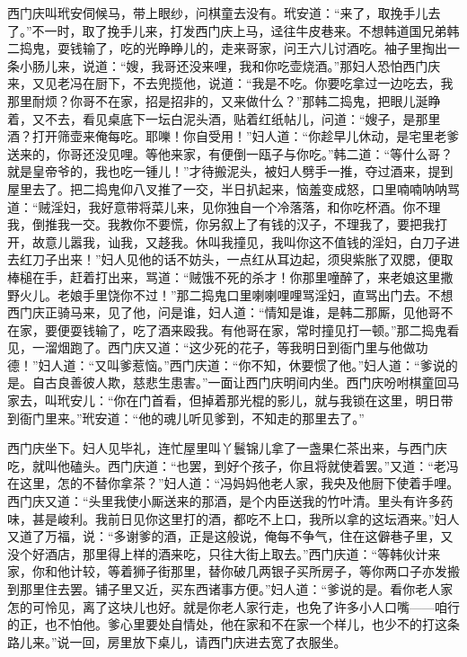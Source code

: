 西门庆叫玳安伺候马，带上眼纱，问棋童去没有。玳安道：“来了，取挽手儿去了。”不一时，取了挽手儿来，打发西门庆上马，迳往牛皮巷来。不想韩道国兄弟韩二捣鬼，耍钱输了，吃的光睁睁儿的，走来哥家，问王六儿讨酒吃。袖子里掏出一条小肠儿来，说道：“嫂，我哥还没来哩，我和你吃壶烧酒。”那妇人恐怕西门庆来，又见老冯在厨下，不去兜揽他，说道：“我是不吃。你要吃拿过一边吃去，我那里耐烦？你哥不在家，招是招非的，又来做什么？”那韩二捣鬼，把眼儿涎睁着，又不去，看见桌底下一坛白泥头酒，贴着红纸帖儿，问道：“嫂子，是那里酒？打开筛壶来俺每吃。耶嚛！你自受用！”妇人道：“你趁早儿休动，是宅里老爹送来的，你哥还没见哩。等他来家，有便倒一瓯子与你吃。”韩二道：“等什么哥？就是皇帝爷的，我也吃一锺儿！”才待搬泥头，被妇人劈手一推，夺过酒来，提到屋里去了。把二捣鬼仰八叉推了一交，半日扒起来，恼羞变成怒，口里喃喃呐呐骂道：“贼淫妇，我好意带将菜儿来，见你独自一个冷落落，和你吃杯酒。你不理我，倒推我一交。我教你不要慌，你另叙上了有钱的汉子，不理我了，要把我打开，故意儿嚣我，讪我，又趍我。休叫我撞见，我叫你这不值钱的淫妇，白刀子进去红刀子出来！”妇人见他的话不妨头，一点红从耳边起，须臾紫胀了双腮，便取棒槌在手，赶着打出来，骂道：“贼饿不死的杀才！你那里噇醉了，来老娘这里撒野火儿。老娘手里饶你不过！”那二捣鬼口里喇喇哩哩骂淫妇，直骂出门去。不想西门庆正骑马来，见了他，问是谁，妇人道：“情知是谁，是韩二那厮，见他哥不在家，要便耍钱输了，吃了酒来殴我。有他哥在家，常时撞见打一顿。”那二捣鬼看见，一溜烟跑了。西门庆又道：“这少死的花子，等我明日到衙门里与他做功德！”妇人道：“又叫爹惹恼。”西门庆道：“你不知，休要惯了他。”妇人道：“爹说的是。自古良善彼人欺，慈悲生患害。”一面让西门庆明间内坐。西门庆吩咐棋童回马家去，叫玳安儿：“你在门首看，但掉着那光棍的影儿，就与我锁在这里，明日带到衙门里来。”玳安道：“他的魂儿听见爹到，不知走的那里去了。”

西门庆坐下。妇人见毕礼，连忙屋里叫丫鬟锦儿拿了一盏果仁茶出来，与西门庆吃，就叫他磕头。西门庆道：“也罢，到好个孩子，你且将就使着罢。”又道：“老冯在这里，怎的不替你拿茶？”妇人道：“冯妈妈他老人家，我央及他厨下使着手哩。西门庆又道：“头里我使小厮送来的那酒，是个内臣送我的竹叶清。里头有许多药味，甚是峻利。我前日见你这里打的酒，都吃不上口，我所以拿的这坛酒来。”妇人又道了万福，说：“多谢爹的酒，正是这般说，俺每不争气，住在这僻巷子里，又没个好酒店，那里得上样的酒来吃，只往大街上取去。”西门庆道：“等韩伙计来家，你和他计较，等着狮子街那里，替你破几两银子买所房子，等你两口子亦发搬到那里住去罢。铺子里又近，买东西诸事方便。”妇人道：“爹说的是。看你老人家怎的可怜见，离了这块儿也好。就是你老人家行走，也免了许多小人口嘴——咱行的正，也不怕他。爹心里要处自情处，他在家和不在家一个样儿，也少不的打这条路儿来。”说一回，房里放下桌儿，请西门庆进去宽了衣服坐。

